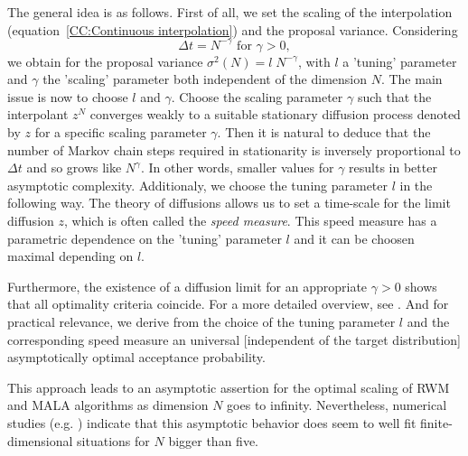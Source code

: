 The general idea is as follows. First of all, we set the scaling of the interpolation (equation~\ref{CC:Continuous interpolation}) and the proposal variance. Considering 
\begin{equation}
\label{CC:Choice of scaling gamma}
  \Delta t = N^{-\gamma} \text{ for } \gamma > 0,                                                                                                                                                                                                                                                                                                                       \end{equation}
we obtain for the proposal variance $ \sigma^2 (N) = l\;N^{-\gamma} $, with $l$ a 'tuning' parameter and $ \gamma $ the 'scaling' parameter both independent of the dimension $N$. The main issue is now to choose $l$ and $\gamma$. Choose the scaling parameter $\gamma$ such that the interpolant $ z^{N} $ converges weakly to a suitable stationary diffusion process denoted by $z$ for a specific scaling parameter $\gamma$. Then it is natural to deduce that the number of Markov chain steps required in stationarity is inversely proportional to $ \Delta t $ and so grows like $ N^{\gamma} $. In other words, smaller values for $\gamma$ results in better asymptotic complexity. Additionaly, we choose the tuning parameter $l$ in the following way. The theory of diffusions allows us to set a time-scale for the limit diffusion $z$, which is often called the \textit{speed measure}. This speed measure has a parametric dependence on the 'tuning' parameter $l$ and it can be choosen maximal depending on $l$. 

Furthermore, the existence of a diffusion limit for an appropriate $ \gamma > 0 $ shows that all optimality criteria coincide. For a more detailed overview, see \autocite{Beskos2009}. And for practical relevance, we derive from the choice of the tuning parameter $l$ and the corresponding speed measure an universal [independent of the target distribution] asymptotically optimal acceptance probability.

\begin{rem}
\label{rem:finite dimension}
 This approach leads to an asymptotic assertion for the optimal scaling of RWM and MALA algorithms as dimension $N$ goes to infinity. Nevertheless, numerical studies (e.g. \autocite{Gelman1996, Roberts2001}) indicate that this asymptotic behavior does seem to well fit finite-dimensional situations for $N$ bigger than five.
\end{rem}

